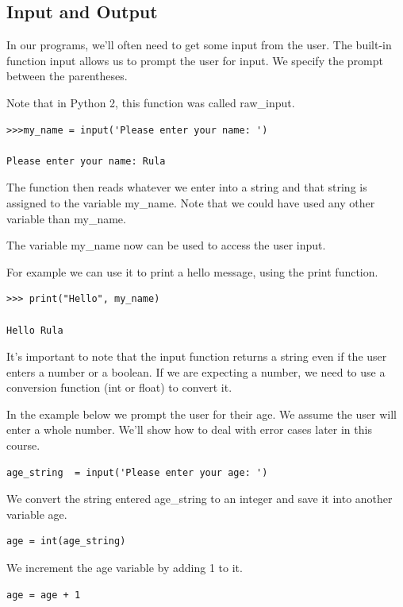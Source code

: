 \documentclass{article}
\begin{document}
\subsection{Input and Output}

In our programs, we'll often need to get some input from the user.  The built-in function input allows us to prompt the user for input.  We specify the prompt between the parentheses.

Note that in Python 2, this function was called raw{\_}input.
\begin{lstlisting}
>>>my_name = input('Please enter your name: ')

Please enter your name: Rula
\end{lstlisting}

The function then reads whatever we enter into a string  and that string is assigned to the variable my{\_}name. Note that we could have used any other variable than my{\_}name.

The variable my{\_}name now can be used to access the user input.

For example we can use it to print a hello message, using the print function.  

\begin{lstlisting}
>>> print("Hello", my_name)

Hello Rula 
\end{lstlisting}

It's important to note that the input function returns a string even if the user enters a number or a boolean.   If we are expecting a number, we need to use a conversion function (int or float) to convert it.

In the example below we prompt the user for their age.  We assume the user will enter a whole number.  We'll show how to deal with error cases later in this course.

\begin{lstlisting}
age_string  = input('Please enter your age: ')
\end{lstlisting}

We convert the string entered age{\_}string to an integer and save it into another variable age.

\begin{lstlisting}
age = int(age_string)
\end{lstlisting}

We increment the age variable by adding 1 to it.  

\begin{lstlisting}
age = age + 1
\end{lstlisting}
\end{document}
